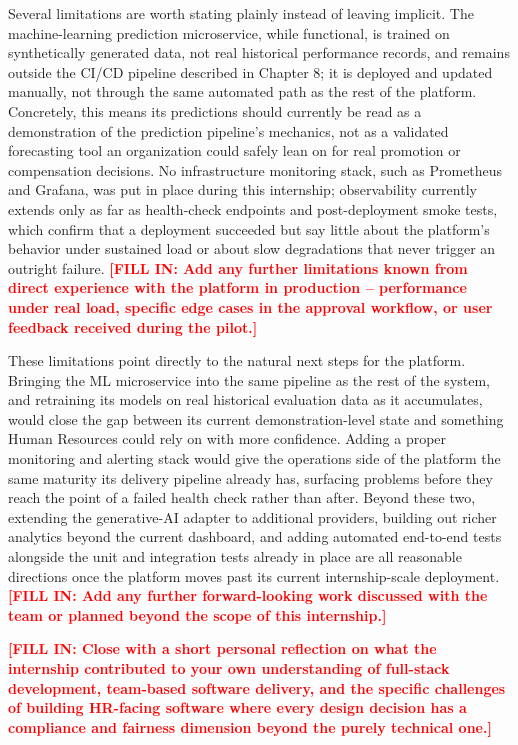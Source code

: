 \documentclass[12pt,a4paper]{report}
\newcommand{\fillin}[1]{\textcolor{red}{\textbf{[FILL IN: #1]}}}
\begin{document}
Several limitations are worth stating plainly instead of leaving implicit. The machine-learning prediction microservice, while functional, is trained on synthetically generated data, not real historical performance records, and remains outside the CI/CD pipeline described in Chapter 8; it is deployed and updated manually, not through the same automated path as the rest of the platform. Concretely, this means its predictions should currently be read as a demonstration of the prediction pipeline's mechanics, not as a validated forecasting tool an organization could safely lean on for real promotion or compensation decisions. No infrastructure monitoring stack, such as Prometheus and Grafana, was put in place during this internship; observability currently extends only as far as health-check endpoints and post-deployment smoke tests, which confirm that a deployment succeeded but say little about the platform's behavior under sustained load or about slow degradations that never trigger an outright failure. \fillin{Add any further limitations known from direct experience with the platform in production -- performance under real load, specific edge cases in the approval workflow, or user feedback received during the pilot.}

These limitations point directly to the natural next steps for the platform. Bringing the ML microservice into the same pipeline as the rest of the system, and retraining its models on real historical evaluation data as it accumulates, would close the gap between its current demonstration-level state and something Human Resources could rely on with more confidence. Adding a proper monitoring and alerting stack would give the operations side of the platform the same maturity its delivery pipeline already has, surfacing problems before they reach the point of a failed health check rather than after. Beyond these two, extending the generative-AI adapter to additional providers, building out richer analytics beyond the current dashboard, and adding automated end-to-end tests alongside the unit and integration tests already in place are all reasonable directions once the platform moves past its current internship-scale deployment. \fillin{Add any further forward-looking work discussed with the team or planned beyond the scope of this internship.}

\fillin{Close with a short personal reflection on what the internship contributed to your own understanding of full-stack development, team-based software delivery, and the specific challenges of building HR-facing software where every design decision has a compliance and fairness dimension beyond the purely technical one.}
\end{document}
